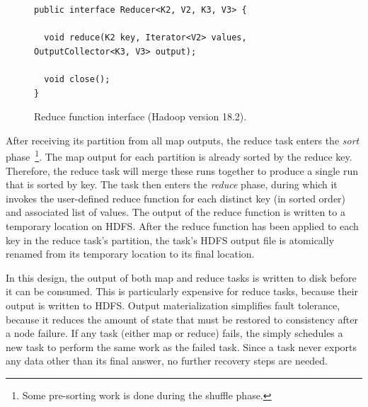 \begin{figure}[t]
\ssp
\begin{minipage}{\linewidth}
\begin{verbatim}
public interface Reducer<K2, V2, K3, V3> {

  void reduce(K2 key, Iterator<V2> values, OutputCollector<K3, V3> output);

  void close();
}
\end{verbatim}

\end{minipage}
\caption{Reduce function interface (Hadoop version 18.2).}
\label{fig:reducefunction}
\end{figure}

After receiving its partition from all map outputs, the reduce task enters the
{\em sort} phase~\footnote{Some pre-sorting work is done during the shuffle
phase.}.  The map output for each partition is already sorted by the reduce
key.  Therefore, the reduce task will merge these runs together to produce a
single run that is sorted by key.  The task then enters the {\em reduce} phase,
during which it invokes the user-defined reduce function for each distinct key
(in sorted order) and associated list of values.  The output of the reduce
function is written to a temporary location on HDFS.  After the reduce function
has been applied to each key in the reduce task's partition, the task's HDFS
output file is atomically renamed from its temporary location to its final
location.

In this design, the output of both map and reduce tasks is written to disk
before it can be consumed. This is particularly expensive for reduce tasks,
because their output is written to HDFS\@. Output materialization simplifies
fault tolerance, because it reduces the amount of state that must be restored to
consistency after a node failure. If any task (either map or reduce) fails, the
{\JT} simply schedules a new task to perform the same work as the failed
task. Since a task never exports any data other than its final answer, no
further recovery steps are needed.






